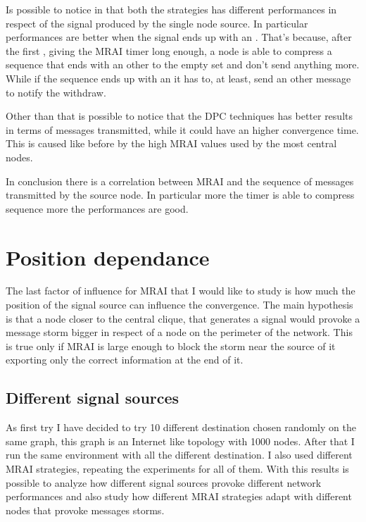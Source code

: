 Is possible to notice in  that
both the strategies has different performances in respect of the signal 
produced by the single node source.
In particular performances are better when the signal ends up with an .
That's because, after the first , giving the \ac{MRAI} timer long enough, 
a node is able to compress a sequence that ends with an other  to the
empty set and don't send anything more.
While if the sequence ends up with an  it has to, at least, send an other
message to notify the withdraw.

Other than that is possible to notice that the \ac{DPC} techniques has better
results in terms of messages transmitted, while it could have an higher 
convergence time.
This is caused like before by the high \ac{MRAI} values used by the most
central nodes.

In conclusion there is a correlation between \ac{MRAI} and the sequence of messages
transmitted by the source node.
In particular more the timer is able to compress sequence more the performances
are good.


\section{Position dependance}
\label{sec:position_dependance}

The last factor of influence for \ac{MRAI} that I would like to study is how much
the position of the signal source can influence the convergence.
The main hypothesis is that a node closer to the central clique, that generates
a signal would provoke a message storm bigger in respect of a node on the perimeter
of the network.
This is true only if \ac{MRAI} is large enough to block the storm near the source
of it exporting only the correct information at the end of it.

\subsection{Different signal sources}
\label{subsec:different_destinations}

As first try I have decided to try \num{10} different destination chosen randomly
on the same graph, this graph is an Internet like topology with \num{1000} nodes.
After that I run the same environment with all the different destination.
I also used different \ac{MRAI} strategies, repeating the experiments for all of
them.
With this results is possible to analyze how different signal sources provoke 
different network performances and also study how different \ac{MRAI} strategies
adapt with different nodes that provoke messages storms.

